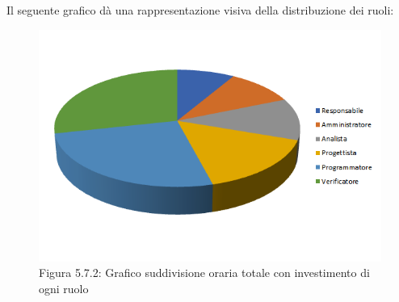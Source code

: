 Il seguente grafico dà una rappresentazione visiva della distribuzione dei ruoli: \\
\begin{figure} [H]
	\centering
	\includegraphics[scale=1]{Res/ExcelGrafici/Grafici/InvestimentoRuoli.png}
	\caption{Figura 5.7.2: Grafico suddivisione oraria totale con investimento di ogni ruolo}\label{}
\end{figure}


\pagebreak